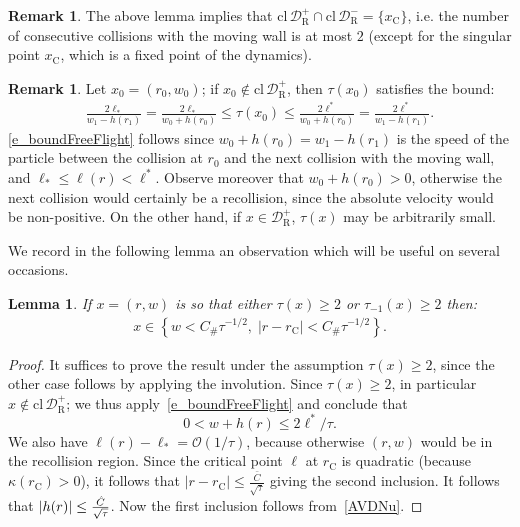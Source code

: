 \documentclass[10pt]{amsart}
\newtheorem{lemm}[theo]{Lemma}\newtheorem{prop}[theo]{Proposition}\newtheorem{coro}[theo]{Corollary}\newtheorem{conj}[theo]{Conjecture}
\theoremstyle{definition}\newtheorem{defi}[theo]{Definition}\newtheorem{rema}[theo]{Remark}\newtheorem{exam}[theo]{Example}\newtheorem{exem}[theo]{Example}\newtheorem{nota}[theo]{Notation}
\newcommand{\nin}{\not\in}
\newcommand{\ct}{r}
\newcommand{\fft}{\tau}
\newcommand{\curv}{\kappa}
\newcommand{\cl}[1]{\mathrm{cl}\,#1}
\newcommand{\crit}{\mathrm{C}}
\newcommand{\ctc}{\ct_\crit}
\newcommand{\xc}{x_\crit}
\newcommand{\cO}{\mathcal{O}}
\newcommand{\cell}{\mathcal{D}}
\newcommand{\privateu}[1]{#1^*}
\newcommand{\privatel}[1]{#1_*}
\newcommand{\slope}{h}
\newcommand{\ellu}{\privateu{\ell}}
\newcommand{\elll}{\privatel{\ell}}
\newcommand{\recoPrivate}{\mathrm{R}}
\newcommand{\reco}{{\cell^-_{\recoPrivate}}}
\newcommand{\backReco}{{\cell^+_{\recoPrivate}}}
\newcommand{\Const}{C_\#}
\newcommand{\clo}{\text{cl}\,}
\let\oldhat\hat
\renewcommand*{\hat}[1]{\mathchoice{\widehat{#1}}{\widehat{#1}}{\oldhat{#1}}{\oldhat{#1}}}
\begin{document}
\begin{rema}\label{r_thereCanBeOnlyOne}
The above lemma implies that $\clo\backReco\cap\clo\reco=\{\xc\}$, i.e. the number of consecutive collisions with the moving wall is at most $2$ (except for the singular point $\xc$, which is a fixed point of the dynamics).
\end{rema}

\begin{rema}\label{r_boundFreeFlight}
Let $x_0=(r_0,w_0)$; if $x_0\not\in\clo\backReco$, then $\fft(x_0)$ satisfies the bound:
\begin{align}\label{e_boundFreeFlight}
\frac{2\elll}{w_1-\slope(\ct_1)} = \frac{2\elll}{w_0+\slope(\ct_0)} \leq \fft(x_0) \leq
\frac{2\ellu}{w_0+\slope(\ct_0)} = \frac{2\ellu}{w_1-\slope(\ct_1)}.
\end{align}
\eqref{e_boundFreeFlight} follows since $w_0+h(r_0)=w_1-h(r_1)$ is the speed of the particle between the collision at $\ct_{0}$ and the next collision with the moving wall, and $\elll\le\ell(\ct) < \ellu$. Observe moreover that $w_0+h(r_0)>0$, otherwise the next collision would certainly be a recollision, since the absolute velocity would be non-positive. On the other hand, if $x\in\backReco$, $\fft(x)$ may be arbitrarily small.
\end{rema}

We record in the following lemma an observation which will be useful on several occasions.
\begin{lemm}\label{lem:geometry}
If $x = (\ct,w)$ is so that either $\fft(x) \geq 2$ or $\fft_{-1}(x)\geq 2$ then:
\begin{align*}
x \in \left\{w < \Const \tau^{-1/2},\; |\ct-\ctc|< \Const
\tau^{-1/2} \right\}.
\end{align*}
\end{lemm}
\begin{proof}
It suffices to prove the result under the assumption $\tau(x)\geq 2$, since the other case follows by applying the involution. Since $\tau(x)\ge 2$, in particular $x\nin\cl\backReco$; we thus apply~\eqref{e_boundFreeFlight} and conclude that
\begin{equation}\label{AVDNu}
0<w+h(\ct) \le 2\ellu/\tau.
\end{equation}
We also have $\ell(\ct)-\elll = \cO(1/\tau)$, because otherwise $(\ct, w)$ would be in the recollision region. Since the critical point $\ell$ at $\ctc$ is quadratic (because $\curv(\ctc) > 0$), it follows that $|\ct-\ctc|\leq \frac{\bar C}{\sqrt{\tau}}$ giving the second inclusion. It follows that $|h(\ct)|\leq \frac{\hat C}{\sqrt{\tau}}$. Now the first inclusion follows from~\eqref{AVDNu}.
\end{proof}
\end{document}
